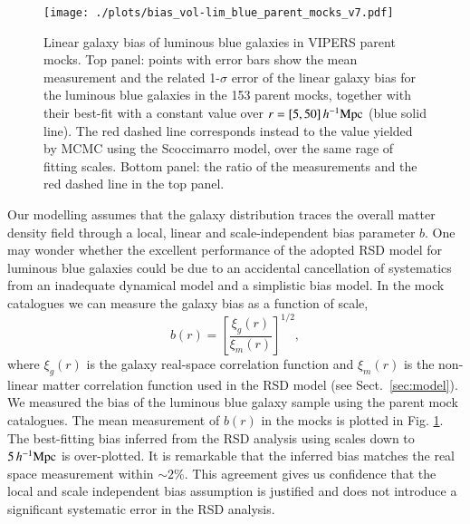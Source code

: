 \documentclass[longauth]{aa}
\def\({\left(}
\def\){\right)}
\def\mhmpc{\,h^{-1}{\rm Mpc}}
\begin{document}
\begin{figure}
	\centering
		\texttt{[image: ./plots/bias\_vol-lim\_blue\_parent\_mocks\_v7.pdf]}
		\caption{Linear galaxy bias of luminous blue galaxies in VIPERS parent mocks. Top panel: points with error bars show the mean measurement and the related 1-$\sigma$ error of the linear galaxy bias for the luminous blue galaxies in the 153 parent mocks, together with their best-fit with a constant value over $r=[5,50]\mhmpc$ (blue solid line). The red dashed line corresponds instead to the value yielded by MCMC using the Scoccimarro model, over the same rage of fitting scales. Bottom panel: the ratio of the measurements and the red dashed line in the top panel.}\label{fig:bias_blue}
\end{figure}
Our modelling assumes that the galaxy distribution traces the overall matter density field through a local, linear and scale-independent bias parameter $b$. One may wonder whether the excellent performance of the adopted RSD model for luminous blue galaxies could be due to an accidental cancellation of systematics from an inadequate dynamical model and a simplistic bias model. In the mock catalogues we can measure the galaxy bias as a function of scale,
    \begin{equation}
        b\(r\)= \left[\frac{\xi_g\(r\)}{\xi_m\(r\)}\right]^{1/2},                                   \label{eq:bias}
    \end{equation}
where $\xi_g(r)$ is the galaxy real-space correlation function and $\xi_m(r)$ is the non-linear matter correlation function used in the RSD model (see Sect.~\ref{sec:model}). We measured the bias of the luminous blue galaxy sample using the parent mock catalogues.  The mean measurement of $b(r)$ in the mocks is plotted in Fig. \ref{fig:bias_blue}.  The best-fitting bias inferred from the RSD analysis using scales down to $5\mhmpc$ is over-plotted.  It is remarkable that the inferred bias matches the real space measurement within $\sim2\%$.  This agreement gives us confidence that the local and scale independent bias assumption is justified and does not introduce a significant systematic error in the RSD analysis.
\end{document}

